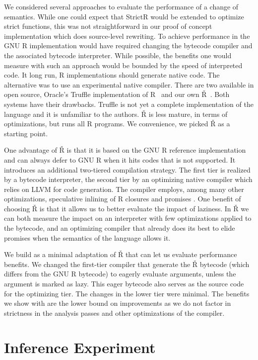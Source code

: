 \documentclass[review,creen,acmsmall]{acmart}
\newcommand{\strictr}{{\sf StrictR}\xspace}
\renewcommand{\Rsh}{{\sf\v R}\xspace}
\begin{document}
We considered several approaches to evaluate the performance of a change of
semantics. While one could expect that \strictr would be extended to optimize
strict functions, this was not straightforward in our proof of concept
implementation which does source-level rewriting. To achieve performance in the
GNU R implementation would have required changing the bytecode compiler and the
associated bytecode interpreter. While possible, the benefits one would measure
with such an approach would be bounded by the speed of interpreted code. It long
run, R implementations should generate native code. The alternative was to use
an experimental native compiler. There are two available in open source,
Oracle's Truffle implementation of R~\cite{Stadler16} and our own
\Rsh~\cite{dls19}. Both systems have their drawbacks. Truffle is not yet a
complete implementation of the language and it is unfamiliar to the authors.
\Rsh is less mature, in terms of optimizations, but runs all R programs. We
convenience, we picked \Rsh as a starting point.

One advantage of \Rsh is that it is based on the GNU R reference implementation
and can always defer to GNU R when it hits codes that is not supported. It
introduces an additional two-tiered compilation strategy. The first tier is
realized by a bytecode interpreter, the second tier by an optimizing native
compiler which relies on LLVM for code generation. The compiler employs, among
many other optimizations, speculative inlining of R closures and promises
\citep{dls19, oopsla20c}.
One benefit of choosing \Rsh is that it allows us to better evaluate the impact
of laziness. In \Rsh we can both measure the impact on an interpreter with few
optimizations applied to the bytecode, and an optimizing compiler that already
does its best to elide promises when the semantics of the language allows it.

We build \rshstrict as a minimal adaptation of \Rsh that can let us evaluate
performance benefits. We changed the first-tier compiler that generate the \Rsh
bytecode (which differs from the GNU R bytecode) to eagerly evaluate arguments,
unless the argument is marked as lazy. This eager bytecode also serves as the
source code for the optimizing tier.  The changes in the lower tier were minimal.
The benefits we show with \rshstrict are the lower bound on improvements as we
do not factor in strictness in the analysis passes and other optimizations of
the compiler.


\section{Inference Experiment}
\end{document}
